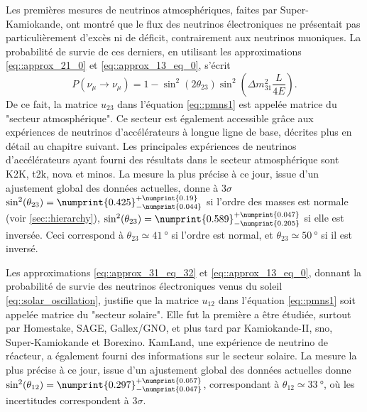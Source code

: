       Les premières mesures de neutrinos atmosphériques, faites par Super-Kamiokande\cite{Fukuda1998}, ont montré que le flux des neutrinos électroniques ne présentait pas particulièrement d'excès ni de déficit, contrairement aux neutrinos muoniques. La probabilité de survie de ces derniers, en utilisant les approximations \eqref{eq::approx_21_0} et \eqref{eq::approx_13_eq_0}, s'écrit
      \begin{equation}\label{eq::mu_approx_atmo}
        P(\nu_{\mu}\to\nu_{\mu}) = 1 - \sin^2(2\theta_{23})\sin^2\left(\Delta m^2_{31}\frac{L}{4E}\right).
      \end{equation}
      De ce fait, la matrice $u_{23}$ dans l'équation \eqref{eq::pmns1} est appelée matrice du "secteur atmosphérique". Ce secteur est également accessible grâce aux expériences de neutrinos d'accélérateurs à longue ligne de base, décrites plus en détail au chapitre suivant. Les principales expériences de neutrinos d'accélérateurs ayant fourni des résultats dans le secteur atmosphérique sont K2K\cite{Collaboration2006a}, \gls{t2k}\cite{Abe2018}, \gls{nova}\cite{Adamson2016} et \gls{minos}\cite{Collaboration2014}. La mesure la plus précise à ce jour, issue d'un ajustement global des données actuelles, donne à $3\sigma$ $\sin^2(\theta_{23})=\numprint{0.425}^{+\numprint{0.19}}_{-\numprint{0.044}}$\cite{pdg2018} si l'ordre des masses est normale (voir \autoref{sec::hierarchy}), $\sin^2(\theta_{23})=\numprint{0.589}^{+\numprint{0.047}}_{-\numprint{0.205}}$ si elle est inversée. Ceci correspond à $\theta_{23}\simeq\SI{41}{\degree}$ si l'ordre est normal, et $\theta_{23}\simeq\SI{50}{\degree}$ si il est inversé.

      Les approximations \eqref{eq::approx_31_eq_32} et \eqref{eq::approx_13_eq_0}, donnant la probabilité de survie des neutrinos électroniques venus du soleil \eqref{eq::solar_oscillation}, justifie que la matrice $u_{12}$ dans l'équation \eqref{eq::pmns1} soit appelée matrice du "secteur solaire". Elle fut la première a être étudiée, surtout par Homestake\cite{Lande1990}, SAGE\cite{Collaboration2009}, Gallex/GNO\cite{Hampel1999}, et plus tard par  Kamiokande-II\cite{Hirata1992}, \gls{sno}\cite{Aharmim2013}, Super-Kamiokande\cite{Abe2018} et Borexino\cite{Collaboration2013}. KamLand\cite{Collaboration2004}, une expérience de neutrino de réacteur, a également fourni des informations sur le secteur solaire. La mesure la plus précise à ce jour, issue d'un ajustement global des données actuelles donne $\sin^2(\theta_{12})=\numprint{0.297}^{+\numprint{0.057}}_{-\numprint{0.047}}$\cite{pdg2018}, correspondant à $\theta_{12}\simeq\SI{33}{\degree}$, où les incertitudes correspondent à $3\sigma$.

